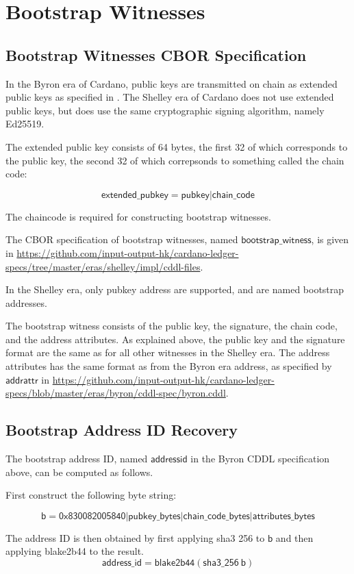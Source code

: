 \section{Bootstrap Witnesses}
\label{sec:bootstrap-witnesses}

\subsection{Bootstrap Witnesses CBOR Specification}

In the Byron era of Cardano, public keys are transmitted
on chain as extended public keys as specified in \cite{bip32}.
The Shelley era of Cardano does not use extended public keys,
but does use the same cryptographic signing algorithm,
namely Ed25519.

The extended public key consists of 64 bytes,
the first 32 of which corresponds to the public key,
the second 32 of which correpsonds to something called the chain code:

$$\mathsf{extended\_pubkey} = \mathsf{pubkey}|\mathsf{chain\_code}$$

The chaincode is required for constructing bootstrap witnesses.

The CBOR specification of bootstrap witnesses,
named $\mathsf{bootstrap\_witness}$,
is given in
\url{https://github.com/input-output-hk/cardano-ledger-specs/tree/master/eras/shelley/impl/cddl-files}.

In the Shelley era, only pubkey address are supported,
and are named bootstrap addresses.

The bootstrap witness consists of the public key, the signature,
the chain code, and the address attributes.
As explained above, the public key and the signature format
are the same as for all other witnesses in the Shelley era.
The address attributes has the same format as from the Byron era address,
as specified by $\mathsf{addrattr}$ in
\url{https://github.com/input-output-hk/cardano-ledger-specs/blob/master/eras/byron/cddl-spec/byron.cddl}.


\subsection{Bootstrap Address ID Recovery}

The bootstrap address ID, named $\mathsf{addressid}$ in the Byron CDDL
specification above, can be computed as follows.

First construct the following byte string:

$$\mathsf{b} =
  \mathsf{0x830082005840}
  | \mathsf{pubkey\_bytes}
  | \mathsf{chain\_code\_bytes}
  | \mathsf{attributes\_bytes}
$$

The address ID is then obtained by first applying
sha3 256 to $\mathsf{b}$ and then applying blake2b44 to the result.
$$\mathsf{address\_id} =
  \mathsf{blake2b44}(\mathsf{sha3\_256}~\mathsf{b})
$$
